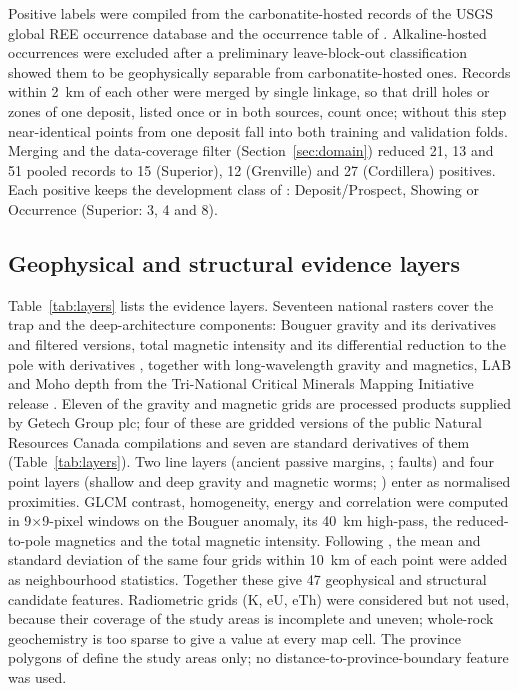 \documentclass[pdflatex,sn-apa]{sn-jnl}
\begin{document}
Positive labels were compiled from the carbonatite-hosted records of the USGS global REE occurrence database \citep{Orris2018} and the occurrence table of \citet{Parsa2024}. Alkaline-hosted occurrences were excluded after a preliminary leave-block-out classification showed them to be geophysically separable from carbonatite-hosted ones. Records within 2~km of each other were merged by single linkage, so that drill holes or zones of one deposit, listed once or in both sources, count once; without this step near-identical points from one deposit fall into both training and validation folds. Merging and the data-coverage filter (Section~\ref{sec:domain}) reduced 21, 13 and 51 pooled records to 15 (Superior), 12 (Grenville) and 27 (Cordillera) positives. Each positive keeps the development class of \citet{Parsa2024}: Deposit/Prospect, Showing or Occurrence (Superior: 3, 4 and 8).

\subsection{Geophysical and structural evidence layers}\label{sec:layers}

Table~\ref{tab:layers} lists the evidence layers. Seventeen national rasters cover the trap and the deep-architecture components: Bouguer gravity and its derivatives and filtered versions, total magnetic intensity and its differential reduction to the pole with derivatives \citep{Jobin2017,Miles2016}, together with long-wavelength gravity and magnetics, LAB and Moho depth from the Tri-National Critical Minerals Mapping Initiative release \citep{McCafferty2023}. Eleven of the gravity and magnetic grids are processed products supplied by Getech Group plc; four of these are gridded versions of the public Natural Resources Canada compilations and seven are standard derivatives of them (Table~\ref{tab:layers}). Two line layers (ancient passive margins, \citealp{BradleyDC2008}; faults) and four point layers (shallow and deep gravity and magnetic worms; \citealp{McCafferty2023}) enter as normalised proximities. GLCM contrast, homogeneity, energy and correlation were computed in 9$\times$9-pixel windows on the Bouguer anomaly, its 40~km high-pass, the reduced-to-pole magnetics and the total magnetic intensity. Following \citet{Luo2026}, the mean and standard deviation of the same four grids within 10~km of each point were added as neighbourhood statistics. Together these give 47 geophysical and structural candidate features. Radiometric grids (K, eU, eTh) were considered but not used, because their coverage of the study areas is incomplete and uneven; whole-rock geochemistry is too sparse to give a value at every map cell. The province polygons of \citet{Wheeler1996} define the study areas only; no distance-to-province-boundary feature was used.
\end{document}
